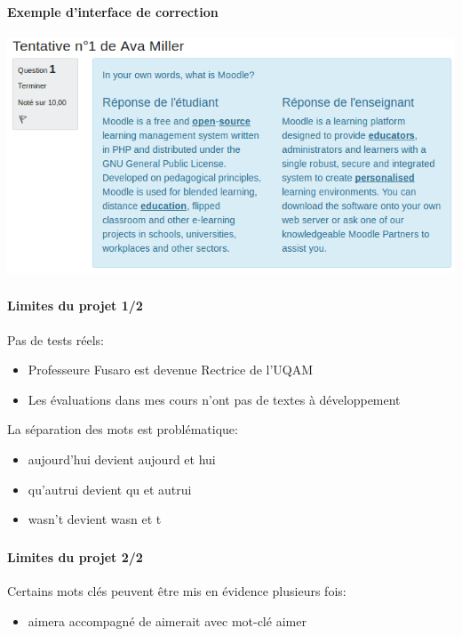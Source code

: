 \documentclass{beamer}
\begin{document}
  \begin{frame}
  \frametitle{\insertsection}
  \framesubtitle{Exemple d'interface de correction}
  \begin{center}
    \includegraphics[scale=0.4]{../images/questionform_correction.png}
  \end{center}
  \end{frame}
  
  \begin{frame}
  \frametitle{\insertsection}
  \framesubtitle{Limites du projet 1/2}
  Pas de tests réels:
  \begin{itemize}
    \item Professeure Fusaro est devenue Rectrice de l'UQAM
    \item Les \'evaluations dans mes cours n'ont pas de textes \`a d\'eveloppement
  \end{itemize}
  
  \bigskip
  
  La s\'eparation des mots est probl\'ematique:
  \begin{itemize}
    \item \og aujourd'hui \fg{} devient \og aujourd \fg{} et \og hui \fg{} 
    \item \og qu'autrui \fg{} devient \og qu \fg{} et \og autrui \fg{} 
    \item \og wasn't \fg{} devient \og wasn \fg{} et \og t \fg{} 
  \end{itemize}
  \end{frame}
  
  \begin{frame}
  \frametitle{\insertsection}
  \framesubtitle{Limites du projet 2/2}
  Certains mots cl\'es peuvent \^etre mis en \'evidence plusieurs fois:
  \begin{itemize}
    \item \og aimera \fg{} accompagn\'e de \og aimerait \fg{} avec mot-cl\'e \og aimer \fg{}
  \end{itemize}
  \end{frame}
  
\end{document}
